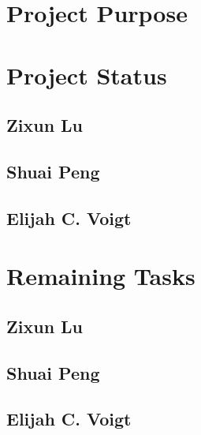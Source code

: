 \section{Project Purpose}



\section{Project Status}

\subsection{Zixun Lu}


\subsection{Shuai Peng}


\subsection{Elijah C. Voigt}



\section{Remaining Tasks}

\subsection{Zixun Lu}



\subsection{Shuai Peng}




\subsection{Elijah C. Voigt}


